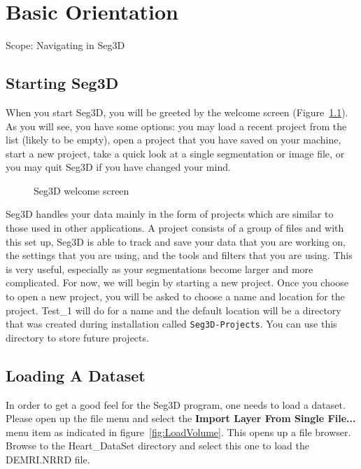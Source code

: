\documentclass[fleqn,11pt,openany]{book}
\begin{document}

\chapter{Basic Orientation}

\begin{introduction}
Scope: Navigating in Seg3D 
\end{introduction}


\section{Starting Seg3D}

When you start Seg3D, you will be greeted by the welcome screen (Figure~\ref{fig:welcome}).  As you will see, you have some options:  you may load a recent project from the list (likely to be empty), open a project that you have saved on your machine, start a new project, take a quick look at a single segmentation or image file, or you may quit Seg3D if you have changed your mind. 

\begin{figure}
\caption{Seg3D welcome screen}\label{fig:welcome}
\end{figure}

Seg3D handles your data mainly in the form of projects which are similar to those used in other applications.  A project consists of a group of files and with this set up, Seg3D is able to track and save your data that you are working on, the settings that you are using, and the tools and filters that you are using.  This is very useful, especially as your segmentations become larger and more complicated.  For now, we will begin by starting a new project.  Once you choose to open a new project, you will be asked to choose a name and location for the project.  Test\_1 will do for a name and the default location will be a directory that was created during installation called {\tt Seg3D-Projects}. You can use this directory to store future projects.

\section{Loading A Dataset}

In order to get a good feel for the Seg3D program, one needs to load a dataset. Please open up the file menu and select the {\bf Import Layer From Single File...} menu item as indicated in figure~\ref{fig:LoadVolume}. This opens up a file browser. Browse to the Heart\_DataSet directory and select this one to load the DEMRI.NRRD file.
\end{document}
